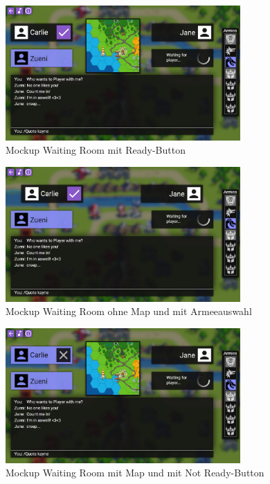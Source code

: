 \documentclass[12pt, titlepage]{scrartcl}
\begin{document}
			\begin{figure}[H] 
				\centering
				\includegraphics[width=0.8\textwidth]{Waiting_Room_Game_Mit_Map_Ready_Button.png}
				\caption{Mockup Waiting Room mit \glqq Ready\grqq-Button}
				\label{WaitingRoomWithReadyButton}
			\end{figure}
			\begin{figure}[H] 
				\centering
				\includegraphics[width=0.8\textwidth]{Waitin_Room_Game_Ohne_Map.png}
				\caption{Mockup Waiting Room ohne Map und mit Armeeauswahl}
				\label{WaitingRoomWithOutMapAndWithArmySelector}
			\end{figure}
			\begin{figure}[H] 
				\centering
				\includegraphics[width=0.8\textwidth]{Waiting_Room_Game_Mit_Map_Not_Ready.png}
				\caption{Mockup Waiting Room mit Map und mit \glqq Not Ready\grqq-Button}
				\label{WaitingRoomWithMapAndWithNotReayButton}
			\end{figure}
		
\end{document}
